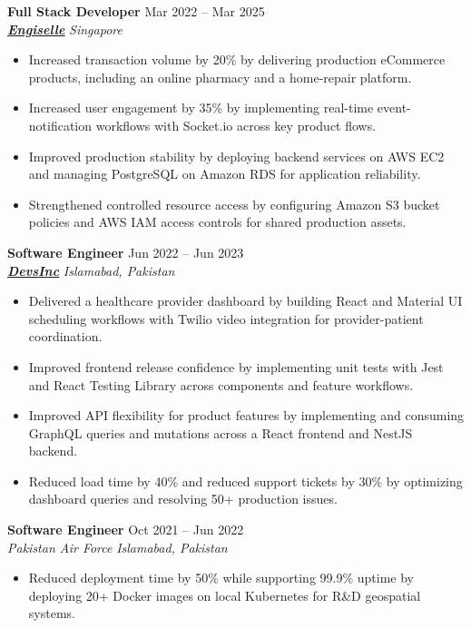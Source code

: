 \documentclass[9pt,letterpaper]{article}
\newcommand{\role}[4]{\textbf{#1} \hfill #2 \\
\textit{#3} \hfill \textit{#4}\\[-5pt]}
\begin{document}
\role{Full Stack Developer}{Mar 2022 -- Mar 2025}{\href{https://www.engiselle.com/}{\textbf{\underline{Engiselle}}}}{Singapore}
\begin{itemize}[leftmargin=*, itemsep=0pt, topsep=0pt, partopsep=0pt, parsep=0pt, after=\vspace{1pt}]
  \item Increased transaction volume by 20\% by delivering production eCommerce products, including an online pharmacy and a home-repair platform.
  \item Increased user engagement by 35\% by implementing real-time event-notification workflows with Socket.io across key product flows.
  \item Improved production stability by deploying backend services on AWS EC2 and managing PostgreSQL on Amazon RDS for application reliability.
  \item Strengthened controlled resource access by configuring Amazon S3 bucket policies and AWS IAM access controls for shared production assets.
\end{itemize}

\role{Software Engineer}{Jun 2022 -- Jun 2023}{\href{https://www.devsinc.com/}{\textbf{\underline{DevsInc}}}}{Islamabad, Pakistan}
\begin{itemize}[leftmargin=*, itemsep=0pt, topsep=0pt, partopsep=0pt, parsep=0pt, after=\vspace{1pt}]
  \item Delivered a healthcare provider dashboard by building React and Material UI scheduling workflows with Twilio video integration for provider-patient coordination.
  \item Improved frontend release confidence by implementing unit tests with Jest and React Testing Library across components and feature workflows.
  \item Improved API flexibility for product features by implementing and consuming GraphQL queries and mutations across a React frontend and NestJS backend.
  \item Reduced load time by 40\% and reduced support tickets by 30\% by optimizing dashboard queries and resolving 50+ production issues.
\end{itemize}

\role{Software Engineer}{Oct 2021 -- Jun 2022}{Pakistan Air Force}{Islamabad, Pakistan}
\begin{itemize}[leftmargin=*, itemsep=0pt, topsep=0pt, partopsep=0pt, parsep=0pt, after=\vspace{1pt}]
  \item Reduced deployment time by 50\% while supporting 99.9\% uptime by deploying 20+ Docker images on local Kubernetes for R\&D geospatial systems.
\end{itemize}
\end{document}
